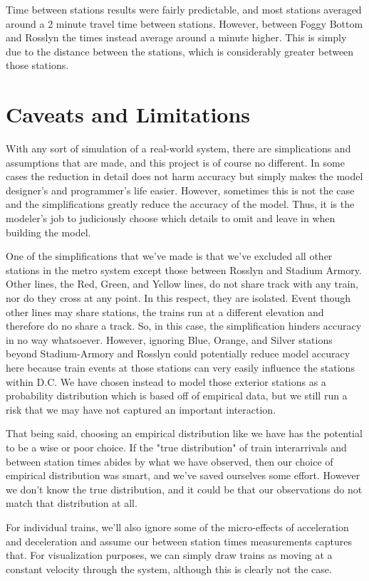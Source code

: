\documentclass[a4paper,12pt]{article}
\begin{document}
Time between stations results were fairly predictable, and most stations averaged around a 2 minute travel time between
stations. However, between Foggy Bottom and Rosslyn the times instead average around a minute higher. This is simply
due to the distance between the stations, which is considerably greater between those stations.

\section{Caveats and Limitations}
With any sort of simulation of a real-world system, there are simplications and assumptions that are made, and this project is of course no
different. In some cases the reduction in detail does not harm accuracy but simply makes the model designer's and
programmer's life easier. However, sometimes this is not the case and the simplifications greatly reduce the accuracy
of the model. Thus, it is the modeler's job to judiciously choose which details to omit and leave in when building the
model.

One of the simplifications that we've made is that we've excluded all other stations in the metro system except those
between Rosslyn and Stadium Armory. Other lines, the Red, Green, and Yellow lines, do not share track with any train,
nor do they cross at any point. In this respect, they are isolated. Event though other lines may share stations, the
trains run at a different elevation and therefore do no share a track. So, in this case, the simplification hinders
accuracy in no way whatsoever. However, ignoring Blue, Orange, and Silver stations beyond Stadium-Armory and Rosslyn
could potentially
reduce model accuracy here because train events at those stations can very easily influence the stations within D.C.
We have chosen instead to model those exterior stations as a probability distribution which is based off of empirical
data, but we still run a risk that we may have not captured an important interaction.

That being said, choosing an empirical distribution like we have has the potential to be a wise or poor choice. If the
"true distribution" of train interarrivals and between station times abides by what we have observed, then our choice
of empirical distribution was smart, and we've saved ourselves some effort. However we don't know the true
distribution, and it could be that our observations do not match that distribution at all.

For individual trains, we'll also ignore some of the micro-effects of acceleration and deceleration and assume our
between station times measurements captures that. For visualization purposes, we can simply draw trains as moving at a
constant velocity through the system, although this is clearly not the case.
\end{document}
